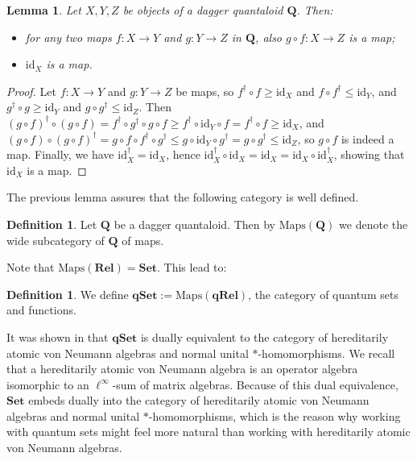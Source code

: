 \documentclass[12pt]{tac}
\newtheorem{lemma}[theorem]{Lemma}
\theoremstyle{definition}
\newtheorem{definition}[theorem]{Definition}
\theoremstyle{remark}
\newcommand{\<}{\langle}
\renewcommand{\>}{\rangle}
\renewcommand{\:}{\colon}
\newcommand{\id}{\mathrm{id}}
\newcommand{\Set}{\mathbf{Set}}
\newcommand{\qSet}{\mathbf{qSet}}
\begin{document}
\begin{lemma}
 Let $X,Y,Z$ be objects of a dagger quantaloid $\mathbf Q$. Then:
    \begin{itemize}
        \item[(1)] for any two maps $f:X\to Y$ and $g:Y\to Z$ in $\mathbf Q$, also $g\circ f:X\to Z$ is a map;
        \item[(2)] $\id_X$ is a map.
    \end{itemize}
\end{lemma}
\begin{proof}
    Let $f:X\to Y$ and $g:Y\to Z$ be maps, so $f^\dag\circ f\geq \id_X$ and $f\circ f^\dag\leq \id_Y$, and $g^\dag\circ g\geq \id_Y$ and $g\circ g^\dag\leq\id_Z$. Then $(g\circ f)^\dag\circ(g\circ f)=f^\dag\circ g^\dag\circ g\circ f\geq f^\dag\circ\id_Y\circ f=f^\dag\circ f\geq\id_X$, and $(g\circ f)\circ (g\circ f)^\dag=g\circ f\circ f^\dag\circ g^\dag\leq g\circ\id_Y\circ g^\dag=g\circ g^\dag\leq\id_Z$, so $g\circ f$ is indeed a map. Finally, we have $\id_X^\dag=\id_X$, hence $\id_X^\dag\circ\id_X=\id_X=\id_X\circ\id_X^\dag$, showing that $\id_X$ is a map.
\end{proof}
The previous lemma assures that the following category is well defined.
\begin{definition}
    Let $\mathbf Q$ be a dagger quantaloid. Then by $\mathrm{Maps}(\mathbf Q)$ we denote the wide subcategory of $\mathbf Q$ of maps. 
\end{definition}

Note that $\mathrm{Maps}(\mathbf{Rel})=\mathbf{Set}$. This lead to:
\begin{definition}We define $\mathbf{qSet}:=\mathrm{Maps}(\mathbf{qRel})$, the category of quantum sets and functions.
\end{definition}
It was shown in \cite{Kornell18} that $\qSet$ is dually equivalent to the category of hereditarily atomic von Neumann algebras and normal unital $*$-homomorphisms. We recall that a hereditarily atomic von Neumann algebra is an operator algebra isomorphic to an $\ell^\infty$-sum of matrix algebras. Because of this dual equivalence, $\Set$ embeds dually into the category of hereditarily atomic von Neumann algebras and normal unital $*$-homomorphisms, which is the reason why working with quantum sets might feel more natural than working with hereditarily atomic von Neumann algebras.
\end{document}
